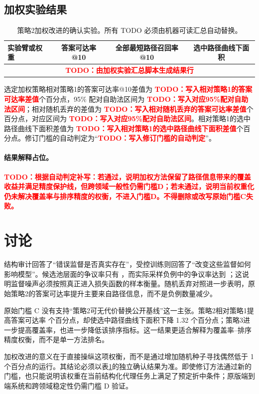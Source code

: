 \documentclass[UTF8,11pt]{ctexart}
\newcommand{\WeightedTodo}[1]{\textcolor{red}{\textbf{TODO：#1}}}
\newcommand{\WeightedMetricRows}{\multicolumn{4}{c}{\WeightedTodo{由加权实验汇总脚本生成结果行}} \\
}
\newcommand{\WeightedVsStrategyOneDifference}{\WeightedTodo{写入相对策略1的答案可达率差值}}
\newcommand{\WeightedVsStrategyOneCI}{\WeightedTodo{写入对应95\%配对自助法区间}}
\newcommand{\WeightedVsRandomDropDifference}{\WeightedTodo{写入相对随机丢弃的答案可达率差值}}
\newcommand{\WeightedVsRandomDropCI}{\WeightedTodo{写入对应95\%配对自助法区间}}
\newcommand{\WeightedPrecisionDifference}{\WeightedTodo{写入相对策略1的选中路径曲线下面积差值}}
\newcommand{\WeightedDecision}{\WeightedTodo{写入修订门槛的自动判定}}
\begin{document}
\subsection{加权实验结果}

\begin{table}[H]
\centering
\small
\begin{tabular}{lccc}
\toprule
实验臂或权重 & 答案可达率@10 & 全部最短路径召回率@10 & 选中路径曲线下面积\\
\midrule
\WeightedMetricRows
\bottomrule
\end{tabular}
\caption{策略2加权改进的确认实验。所有 TODO 必须由机器可读汇总自动替换。}
\label{tab:weighted}
\end{table}

选定加权策略相对策略1的答案可达率@10差值为 \WeightedVsStrategyOneDifference 个百分点，95\% 配对自助法区间为 \WeightedVsStrategyOneCI；相对随机丢弃的差值为 \WeightedVsRandomDropDifference 个百分点，对应区间为 \WeightedVsRandomDropCI。相对策略1的选中路径曲线下面积差值为 \WeightedPrecisionDifference 个百分点。修订门槛的自动判定为“\WeightedDecision”。

\paragraph{结果解释占位。}
\WeightedTodo{根据自动判定补写：若通过，说明加权方法保留了路径信息带来的覆盖收益并满足精度保护线，但跨领域一般性仍需门槛D；若未通过，说明当前权重化仍未解决覆盖率与排序精度的权衡，不进入门槛D。不得删除或改写原始门槛C失败。}

\section{讨论}

结构审计回答了“错误监督是否真实存在”，受控训练则回答了“改变这些监督如何影响模型”。候选池层面的争议率只有 \CandidateRate，而实际采样负例中的争议率达到 \SampledRate；这说明监督噪声必须按照真正进入损失函数的样本衡量。随机丢弃对照进一步表明，原始策略2的答案可达率提升主要来自路径信息，而不是负例数量减少。

原始门槛 C 没有支持“策略2可无代价替换公开基线”这一主张。策略2相对策略1提高答案可达率 \VsStrategyOneDifference 个百分点，却使选中路径曲线下面积下降 1.32 个百分点；策略3进一步提高覆盖率，也进一步降低该排序指标。这一结果更适合解释为覆盖率--排序精度权衡，而不是单一方法排名。

加权改进的意义在于直接操纵这项权衡，而不是通过增加随机种子寻找偶然低于 1 个百分点的运行。其结论必须以表\ref{tab:weighted}的独立确认结果为准。即使修订方法通过新的门槛，也只能说明该权重在当前结构化代理任务上满足了预定折中条件；原版端到端系统和跨领域稳定性仍需门槛 D 验证。
\end{document}
